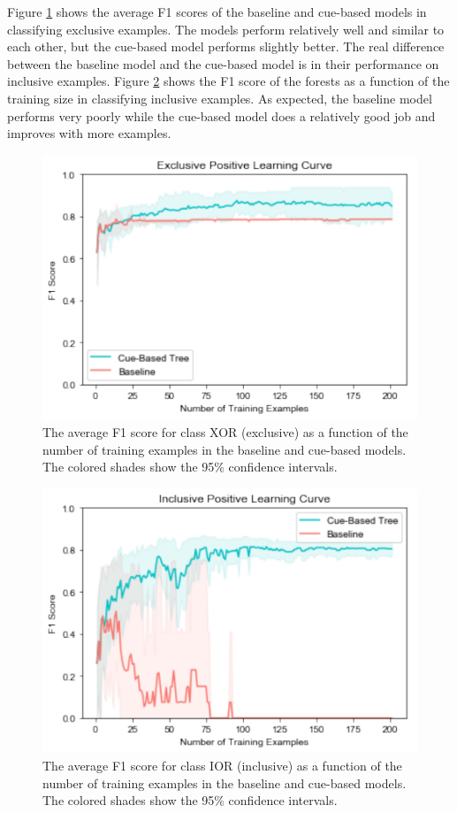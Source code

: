 \documentclass[,man,floatsintext]{apa6}
\begin{document}
Figure \ref{fig:XorBinary} shows the average F1 scores of the baseline and cue-based models in classifying exclusive examples. The models perform relatively well and similar to each other, but the cue-based model performs slightly better. The real difference between the baseline model and the cue-based model is in their performance on inclusive examples. Figure \ref{fig:IorBinary} shows the F1 score of the forests as a function of the training size in classifying inclusive examples. As expected, the baseline model performs very poorly while the cue-based model does a relatively good job and improves with more examples.

\begin{figure}
\centering
\includegraphics{figs/XorBinary-1.pdf}
\caption{\label{fig:XorBinary}The average F1 score for class XOR (exclusive) as a function of the number of training examples in the baseline and cue-based models. The colored shades show the 95\% confidence intervals.}
\end{figure}

\begin{figure}
\centering
\includegraphics{figs/IorBinary-1.pdf}
\caption{\label{fig:IorBinary}The average F1 score for class IOR (inclusive) as a function of the number of training examples in the baseline and cue-based models. The colored shades show the 95\% confidence intervals.}
\end{figure}
\end{document}
